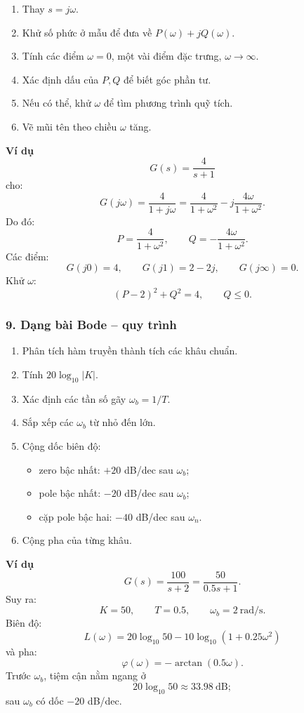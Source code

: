 \begin{enumerate}
  \item Thay $s=j\omega$.
  \item Khử số phức ở mẫu để đưa về $P(\omega)+jQ(\omega)$.
  \item Tính các điểm $\omega=0$, một vài điểm đặc trưng, $\omega\to\infty$.
  \item Xác định dấu của $P,Q$ để biết góc phần tư.
  \item Nếu có thể, khử $\omega$ để tìm phương trình quỹ tích.
  \item Vẽ mũi tên theo chiều $\omega$ tăng.
\end{enumerate}

\textbf{Ví dụ}
\[
G(s)=\frac{4}{s+1}
\]
cho:
\[
G(j\omega)
=\frac{4}{1+j\omega}
=
\frac{4}{1+\omega^2}
-j\frac{4\omega}{1+\omega^2}.
\]
Do đó:
\[
P=\frac{4}{1+\omega^2},\qquad
Q=-\frac{4\omega}{1+\omega^2}.
\]
Các điểm:
\[
G(j0)=4,\qquad
G(j1)=2-2j,\qquad
G(j\infty)=0.
\]
Khử $\omega$:
\[
\boxed{
(P-2)^2+Q^2=4,\qquad Q\le0.
}
\]

\subsubsection*{9. Dạng bài Bode -- quy trình}

\begin{enumerate}
  \item Phân tích hàm truyền thành tích các khâu chuẩn.
  \item Tính $20\log_{10}|K|$.
  \item Xác định các tần số gãy $\omega_b=1/T$.
  \item Sắp xếp các $\omega_b$ từ nhỏ đến lớn.
  \item Cộng dốc biên độ:
  \begin{itemize}
    \item zero bậc nhất: $+20$ dB/dec sau $\omega_b$;
    \item pole bậc nhất: $-20$ dB/dec sau $\omega_b$;
    \item cặp pole bậc hai: $-40$ dB/dec sau $\omega_n$.
  \end{itemize}
  \item Cộng pha của từng khâu.
\end{enumerate}

\textbf{Ví dụ}
\[
G(s)=\frac{100}{s+2}
=\frac{50}{0.5s+1}.
\]
Suy ra:
\[
K=50,\qquad T=0.5,\qquad \omega_b=2\ \mathrm{rad/s}.
\]
Biên độ:
\[
\boxed{
L(\omega)=
20\log_{10}50
-10\log_{10}(1+0.25\omega^2)
}
\]
và pha:
\[
\boxed{
\varphi(\omega)=-\arctan(0.5\omega).
}
\]
Trước $\omega_b$, tiệm cận nằm ngang ở
\[
20\log_{10}50\approx33.98\ \mathrm{dB};
\]
sau $\omega_b$ có dốc $-20$ dB/dec.

